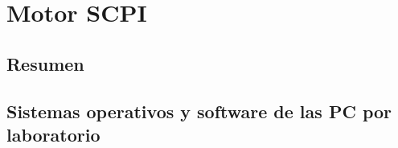 \chapter[Motor SCPI]{Motor SCPI}
\label{cp:Motor-SCPI}

\section*{Resumen}

\section{Sistemas operativos y software de las PC por laboratorio}
